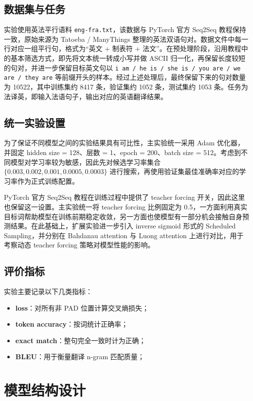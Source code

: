\documentclass[a4paper]{article}
\begin{document}
\subsection{数据集与任务}
实验使用英法平行语料 \texttt{eng-fra.txt}，该数据与 PyTorch 官方 Seq2Seq 教程保持一致，原始来源为 Tatoeba / ManyThings 整理的英法双语句对。数据文件中每一行对应一组平行句，格式为“英文 + 制表符 + 法文”。在预处理阶段，沿用教程中的基本筛选方式，即先将文本统一转成小写并做 ASCII 归一化，再保留长度较短的句对，并进一步保留目标英文句以 \texttt{i am / he is / she is / you are / we are / they are} 等前缀开头的样本。经过上述处理后，最终保留下来的句对数量为 10522，其中训练集约 8417 条，验证集约 1052 条，测试集约 1053 条。任务为法译英，即输入法语句子，输出对应的英语翻译结果。

\subsection{统一实验设置}
为了保证不同模型之间的实验结果具有可比性，主实验统一采用 Adam 优化器，并固定 hidden size = 128、层数 = 1、epoch = 200、batch size = 512。考虑到不同模型对学习率较为敏感，因此先对候选学习率集合 $\{0.003, 0.002, 0.001, 0.0005, 0.0003\}$ 进行搜索，再使用验证集最佳准确率对应的学习率作为正式训练配置。

PyTorch 官方 Seq2Seq 教程在训练过程中提供了 teacher forcing 开关，因此这里也保留这一设置。主实验统一将 teacher forcing 比例固定为 0.5，一方面利用真实目标词帮助模型在训练前期稳定收敛，另一方面也使模型有一部分机会接触自身预测结果。在此基础上，扩展实验进一步引入 inverse sigmoid 形式的 Scheduled Sampling\cite{bengio2015scheduled}，并分别在 Bahdanau attention 与 Luong attention 上进行对比，用于考察动态 teacher forcing 策略对模型性能的影响。

\subsection{评价指标}
实验主要记录以下几类指标：
\begin{itemize}
    \item \textbf{loss}：对所有非 PAD 位置计算交叉熵损失；
    \item \textbf{token accuracy}：按词统计正确率；
    \item \textbf{exact match}：整句完全一致时计为正确；
    \item \textbf{BLEU}：用于衡量翻译 n-gram 匹配质量\cite{papineni2002bleu}；
\end{itemize}

\section{模型结构设计}
\end{document}
